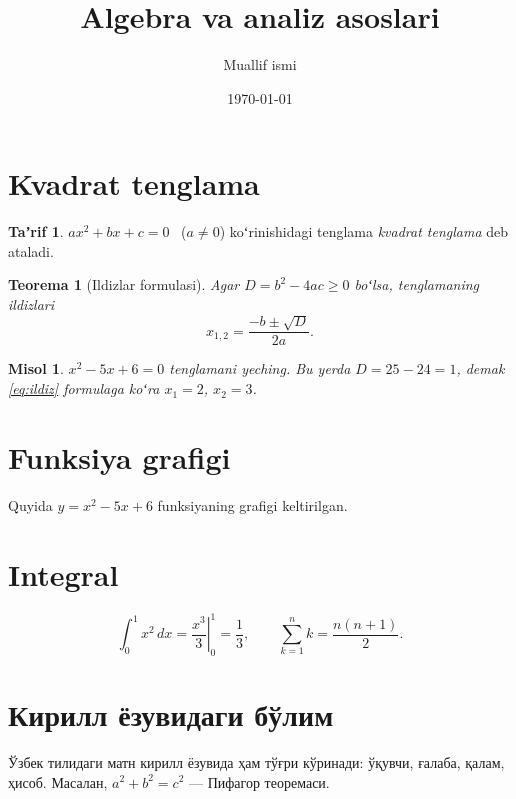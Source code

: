 \documentclass[12pt,a4paper]{article}
\title{Algebra va analiz asoslari}
\author{Muallif ismi}
\date{\today}
\newtheorem{teorema}{Teorema}
\newtheorem{misol}{Misol}
\theoremstyle{definition}
\newtheorem{tarif}{Taʼrif}
\begin{document}
\maketitle



\section{Kvadrat tenglama}

\begin{tarif}
  $ax^2 + bx + c = 0$ \ ($a \neq 0$) koʻrinishidagi tenglama
  \emph{kvadrat tenglama} deb ataladi.
\end{tarif}

\begin{teorema}[Ildizlar formulasi]
  Agar $D = b^2 - 4ac \geq 0$ boʻlsa, tenglamaning ildizlari
  \begin{equation}\label{eq:ildiz}
    x_{1,2} = \frac{-b \pm \sqrt{D}}{2a}.
  \end{equation}
\end{teorema}

\begin{misol}
  $x^2 - 5x + 6 = 0$ tenglamani yeching. Bu yerda $D = 25 - 24 = 1$,
  demak \eqref{eq:ildiz} formulaga koʻra $x_1 = 2$, $x_2 = 3$.
\end{misol}

\section{Funksiya grafigi}

Quyida $y = x^2 - 5x + 6$ funksiyaning grafigi keltirilgan.

\begin{center}
\end{center}

\section{Integral}

\[
  \int_0^1 x^2\,dx = \left.\frac{x^3}{3}\right|_0^1 = \frac{1}{3},
  \qquad
  \sum_{k=1}^{n} k = \frac{n(n+1)}{2}.
\]

\begin{otherlanguage}{uzbekcyr}
\section{Кирилл ёзувидаги бўлим}

Ўзбек тилидаги матн кирилл ёзувида ҳам тўғри кўринади: ўқувчи, ғалаба,
қалам, ҳисоб. Масалан, $a^2 + b^2 = c^2$ — Пифагор теоремаси.
\end{otherlanguage}
\end{document}
